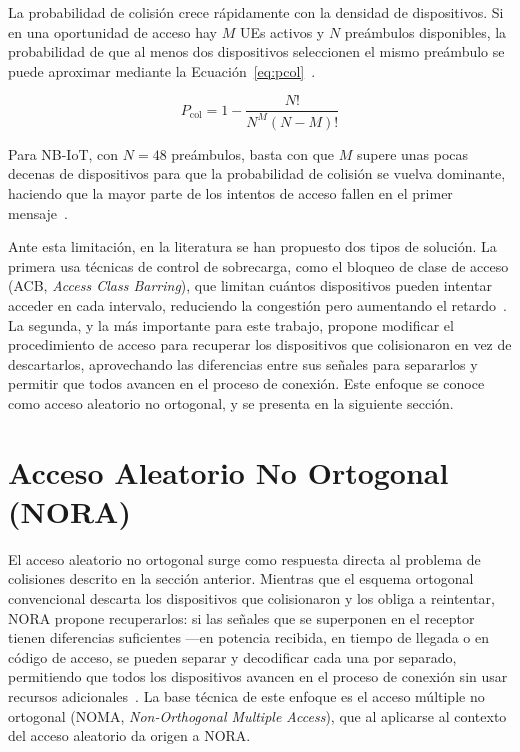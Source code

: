 La probabilidad de colisión crece rápidamente con la densidad de dispositivos. Si en una
oportunidad de acceso hay $M$ UEs activos y $N$ preámbulos disponibles, la probabilidad de que
al menos dos dispositivos seleccionen el mismo preámbulo se puede aproximar mediante la
Ecuación~\ref{eq:pcol}~\cite{ref5}.

\begin{equation}
P_{\text{col}} = 1 - \frac{N!}{N^{M}(N-M)!}
\label{eq:pcol}
\end{equation}

Para NB-IoT, con $N = 48$ preámbulos, basta con que $M$ supere unas pocas decenas de
dispositivos para que la probabilidad de colisión se vuelva dominante, haciendo que la mayor
parte de los intentos de acceso fallen en el primer mensaje~\cite{ref4}.

Ante esta limitación, en la literatura se han propuesto dos tipos de solución. La primera usa
técnicas de control de sobrecarga, como el bloqueo de clase de acceso (ACB,
\textit{Access Class Barring}), que limitan cuántos dispositivos pueden intentar acceder en
cada intervalo, reduciendo la congestión pero aumentando el retardo~\cite{ref6}. La segunda,
y la más importante para este trabajo, propone modificar el procedimiento de acceso para
recuperar los dispositivos que colisionaron en vez de descartarlos, aprovechando las
diferencias entre sus señales para separarlos y permitir que todos avancen en el proceso de
conexión. Este enfoque se conoce como acceso aleatorio no ortogonal, y se presenta en la
siguiente sección.


\section{Acceso Aleatorio No Ortogonal (NORA)}

El acceso aleatorio no ortogonal surge como respuesta directa al problema de colisiones
descrito en la sección anterior. Mientras que el esquema ortogonal convencional descarta los
dispositivos que colisionaron y los obliga a reintentar, NORA propone recuperarlos: si las
señales que se superponen en el receptor tienen diferencias suficientes ---en potencia
recibida, en tiempo de llegada o en código de acceso, se pueden separar y decodificar
cada una por separado, permitiendo que todos los dispositivos avancen en el proceso de
conexión sin usar recursos adicionales~\cite{ref5, ref6}. La base técnica de este enfoque es
el acceso múltiple no ortogonal (NOMA, \textit{Non-Orthogonal Multiple Access}), que al
aplicarse al contexto del acceso aleatorio da origen a NORA.

